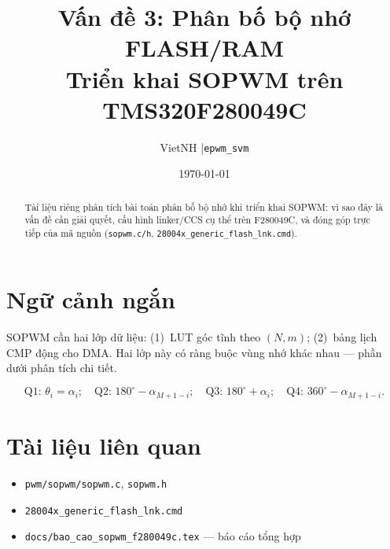 \documentclass[12pt,a4paper]{article}
\title{%
  \textbf{Vấn đề 3: Phân bố bộ nhớ FLASH/RAM}\\[0.3em]
  \large Triển khai SOPWM trên TMS320F280049C
}
\author{VietNH \quad|\quad \texttt{epwm\_svm}}
\date{\today}
\begin{document}
\maketitle

\begin{abstract}
Tài liệu riêng phân tích bài toán phân bố bộ nhớ khi triển khai SOPWM: vì sao đây là vấn đề cần giải quyết, cấu hình linker/CCS cụ thể trên F280049C, và đóng góp trực tiếp của mã nguồn (\texttt{sopwm.c/h}, \texttt{28004x\_generic\_flash\_lnk.cmd}).
\end{abstract}

\tableofcontents
\newpage

\section{Ngữ cảnh ngắn}
SOPWM cần hai lớp dữ liệu: (1)~LUT góc tĩnh theo $(N,m)$; (2)~bảng lịch CMP động cho DMA. Hai lớp này có ràng buộc vùng nhớ khác nhau --- phần dưới phân tích chi tiết.

\begin{equation}
  \text{Q1: } \theta_i = \alpha_i;\quad
  \text{Q2: } 180^\circ - \alpha_{M+1-i};\quad
  \text{Q3: } 180^\circ + \alpha_i;\quad
  \text{Q4: } 360^\circ - \alpha_{M+1-i}.
  \label{eq:quarter_expand}
\end{equation}



\section*{Tài liệu liên quan}
\begin{itemize}
  \item \texttt{pwm/sopwm/sopwm.c}, \texttt{sopwm.h}
  \item \texttt{28004x\_generic\_flash\_lnk.cmd}
  \item \texttt{docs/bao\_cao\_sopwm\_f280049c.tex} --- báo cáo tổng hợp
\end{itemize}
\end{document}
